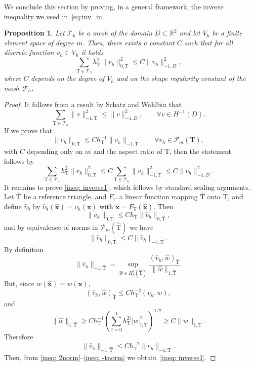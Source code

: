 \documentclass[oneside]{amsart} %
\newcommand{\numberset}{\mathbb}
\newcommand{\R}{\numberset{R}}
\newtheorem{prop}{Proposition}
\newcommand\x{\mathbf{x}} %
\newcommand\T{\mathcal{T}} %
\newcommand\Pcal{\mathcal{P}}
\newcommand\tri{\mathrm{T}} %
\newcommand\reftri{\widehat{\tri}} %
\begin{document}
	We conclude this section by proving, in a general framework, the inverse inequality we used in~\eqref{eq:inv_in}.
	\begin{prop}\label{prop:inv_in}
		Let $\T_h$ be a mesh of the domain $D\subset\R^2$ and let
		$V_h$ be a finite element space of degree $m$. Then, there exists a constant $C$ such that for all discrete function $v_h\in V_h$ it holds
		\[
		\sum_{\tri\in\T_h}h_\tri^2\|v_h\|_{0,\tri}^2 \le C\|v_h\|_{-1,D}^2,
		\]
		where $C$ depends on the degree of $V_h$ and on the shape regularity constant of the mesh~$\T_h$.
	\end{prop}
	\begin{proof}
		It follows from a result by Schatz and Wahlbin \cite[Lemma 1.1]{SW} that 
		\[
		\sum_{\tri\in\T_h}\|v\|_{-1,\tri}^2\le \|v\|_{-1,D}^2, \qquad \forall v\in H^{-1}(D).
		\]
		If we prove that
		\begin{equation}\label{ineq: inverse1}
			\|v_h\|_{0,\tri}\le Ch_\tri^{-1}\|v_h\|_{-1,\tri}\qquad \forall v_h\in \Pcal_m(\tri),
		\end{equation}
		with $C$ depending only on $m$ and the aspect ratio of $\tri$, then the statement follows by
		\[
		\sum_{\tri\in \T_h}h_\tri^2\|v_h\|_{0,\tri}^2\le C\sum_{\tri\in \T_h}\|v_h\|_{-1,\tri}^2\le C\|v_h\|_{-1,D}^2.
		\]
		It remains to prove \eqref{ineq: inverse1}, which follows by standard scaling arguments. Let $\reftri$ be a reference triangle, and $F_\tri$ a linear function mapping $\reftri$ onto $\tri$, and define $\widehat v_h$ by $\widehat v_h(\widehat{\x})=v_h({\x})$ with ${\x}=F_\tri(\widehat{\x})$. Then
		\begin{equation}\label{ineq: 2norm}
			\|v_h\|_{0,\tri}\le Ch_\tri\|\widehat v_h\|_{0,\reftri},
		\end{equation}
		and by equivalence of norms in $\Pcal_m(\reftri)$ we have
		\begin{equation}\label{ineq: equiv}
			\|\widehat v_h\|_{0,\reftri}\le C\|\widehat v_h\|_{-1,\reftri}.
		\end{equation}
		By definition
		\[
		\|\widehat v_h\|_{-1,\reftri}=\sup_{\widehat w\in H_0^1(\reftri)}\frac{\left(\widehat v_h,\widehat w\right)_{\reftri}}{\|\widehat w\|_{1,\reftri}}.
		\]
		But, since $\widehat w(\widehat{\x})=w({\x})$,
		\[
		\left(\widehat v_h,\widehat w\right)_{\reftri}\le Ch_\tri^{-2}\left(v_h,w\right),
		\]
		and
		\[
		\|\widehat w\|_{1,\reftri} \ge C h_\tri^{-1}\left(\sum_{i=0}^1 h_\tri^{2i}|w|^2_{i,\tri}\right)^{1/2}\ge C \|w\|_{1,\tri}.
		\]
		Therefore
		\begin{equation}\label{ineq: -tnorm}
			\|\widehat v_h\|_{-1,\reftri}\le Ch_\tri^{-2}\|v_h\|_{-1,\tri}.
		\end{equation}
		Then, from \eqref{ineq: 2norm}--\eqref{ineq: -tnorm} we
		obtain~\eqref{ineq: inverse1}.
	\end{proof}
	
\end{document}

